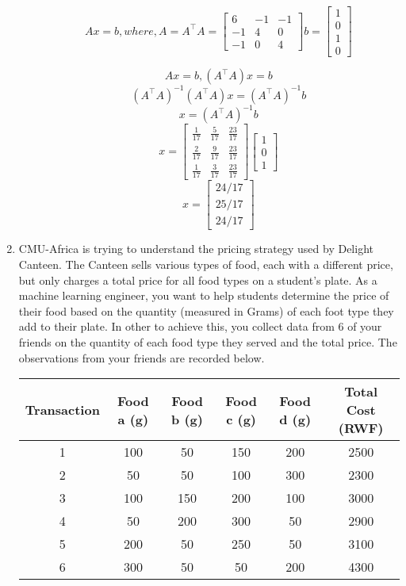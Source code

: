 \documentclass[11pt]{article}
\begin{document}
\begin{enumerate}
\begin{enumerate}
\[
    Ax = b, 
    where, A = A^\top A = \begin{bmatrix}
        6 & -1 & -1 \\
        -1 & 4 & 0 \\
        -1 & 0 & 4
    \end{bmatrix}
    b = \begin{bmatrix}
        1 \\
        0 \\
        1 \\
        0
    \end{bmatrix}
\]

\[
    Ax=b, (A^\top A)x =  b
\]
\[
    (A^\top A)^{-1}(A^\top A)x = (A^\top A)^{-1}b
\]
\[
    x = (A^\top A)^{-1}b
\]
\[
    x = \begin{bmatrix}
        \frac{1}{17} & \frac{5}{17} & \frac{23}{17} \\
        \frac{2}{17} & \frac{9}{17} & \frac{23}{17} \\
        \frac{1}{17} & \frac{3}{17} & \frac{23}{17}
    \end{bmatrix}
    \begin{bmatrix}
        1 \\
        0 \\
        1
    \end{bmatrix}
\]
\[
    x =
    \begin{bmatrix}
        24/17 \\
        25/17 \\
        24/17
    \end{bmatrix}
\]

\end{enumerate}

\item CMU-Africa is trying to understand the pricing strategy used by Delight Canteen. The Canteen sells various types of food, each with a different price, but only charges a total price for all food types on a student’s plate. As a machine learning engineer, you want to help students determine the price of their food based on the quantity (measured in Grams) of each foot type they add to their plate. In other to achieve this, you collect data from 6 of your friends on the quantity of each food type they served and the total price. The observations from your friends are recorded below.

\begin{tabular}{|c|c|c|c|c|c|}
    \hline
    Transaction & Food a (g) & Food b (g) & Food c (g) & Food d (g) & Total Cost (RWF) \\
    \hline
    1 & 100 & 50 & 150 & 200 & 2500 \\
    2 & 50 & 50 & 100 & 300 & 2300 \\
    3 & 100 & 150 & 200 & 100 & 3000 \\
    4 & 50 & 200 & 300 & 50 & 2900 \\
    5 & 200 & 50 & 250 & 50 & 3100 \\
    6 & 300 & 50 & 50 & 200 & 4300 \\
    \hline
\end{tabular}


\end{enumerate}
\end{document}
